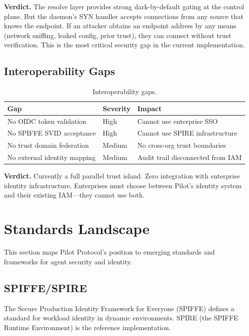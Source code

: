 \documentclass[11pt,a4paper]{article}
\begin{document}
\textbf{Verdict.} The resolve layer provides strong dark-by-default gating at the control plane. But the daemon's SYN handler accepts connections from any source that knows the endpoint. If an attacker obtains an endpoint address by any means (network sniffing, leaked config, prior trust), they can connect without trust verification. This is the most critical security gap in the current implementation.

\subsection{Interoperability Gaps}

\begin{table}[h]
\centering
\begin{tabular}{@{}lll@{}}
\toprule
\textbf{Gap} & \textbf{Severity} & \textbf{Impact} \\
\midrule
No OIDC token validation & High & Cannot use enterprise SSO \\
No SPIFFE SVID acceptance & High & Cannot use SPIRE infrastructure \\
No trust domain federation & Medium & No cross-org trust boundaries \\
No external identity mapping & Medium & Audit trail disconnected from IAM \\
\bottomrule
\end{tabular}
\caption{Interoperability gaps.}
\end{table}

\textbf{Verdict.} Currently a full parallel trust island. Zero integration with enterprise identity infrastructure. Enterprises must choose between Pilot's identity system and their existing IAM---they cannot use both.

\section{Standards Landscape}

This section maps Pilot Protocol's position to emerging standards and frameworks for agent security and identity.

\subsection{SPIFFE/SPIRE}

The Secure Production Identity Framework for Everyone (SPIFFE) defines a standard for workload identity in dynamic environments. SPIRE (the SPIFFE Runtime Environment) is the reference implementation.
\end{document}
